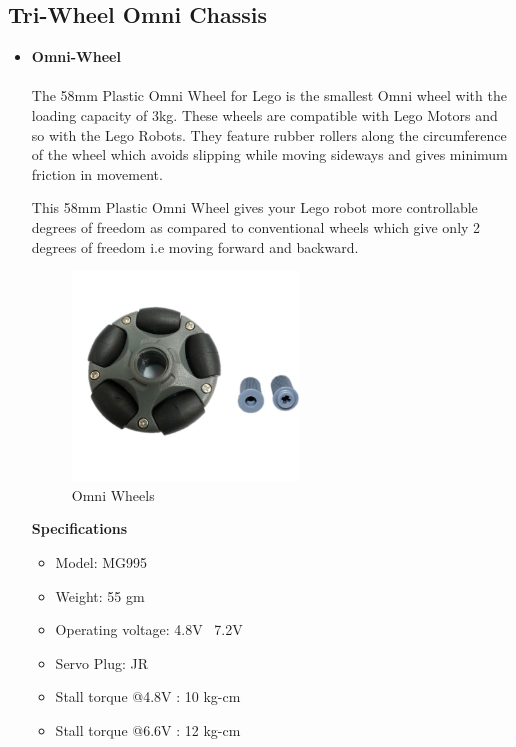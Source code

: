 \newpage

\subsection{Tri-Wheel Omni Chassis}


\begin{itemize}[wide, labelwidth=!, labelindent=0pt]
    
    \item \textbf{Omni-Wheel}
    \vspace{-0.5cm}
    \paragraph{}The 58mm Plastic Omni Wheel for Lego is the smallest Omni wheel with the loading capacity of 3kg. These wheels are compatible with Lego Motors and so with the Lego Robots. They feature rubber rollers along the circumference of the wheel which avoids slipping while moving sideways and gives minimum friction in movement.
    
    This 58mm Plastic Omni Wheel gives your Lego robot more controllable degrees of freedom as compared to conventional wheels which give only 2 degrees of freedom i.e moving forward and backward. 
    
    \begin{figure}[H]
    \centering
    \includegraphics[width = 6cm]{project/images/omni_wheels.jpg}
    \caption{Omni Wheels}
    \end{figure}
    
    \begin{center}{\textbf{Specifications}}\end{center}
    
    \begin{itemize}
        \item Model: MG995
        \item Weight: 55 gm
        \item Operating voltage: 4.8V~ 7.2V
        \item Servo Plug: JR
        \item Stall torque @4.8V : 10 kg-cm
        \item Stall torque @6.6V : 12 kg-cm
    \end{itemize}
    

\end{itemize}
